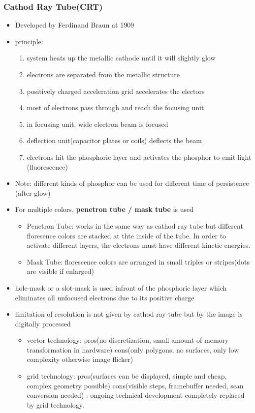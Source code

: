 \documentclass{standalone}
\begin{document}
\subsubsection*{Cathod Ray Tube(CRT)}
\begin{itemize}
\item Developed by Ferdinand Braun at 1909
\item principle:
	\begin{enumerate}
		\item system heats up the metallic cathode until it will slightly glow
		\item electrons are separated from the metallic structure
		\item positively charged acceleration grid accelerates the electors
		\item most of electrons pass through and reach the focusing unit
		\item in focusing unit, wide electron beam is focused 
		\item deflection unit(capacitor plates or coils) deflects the beam
		\item electrons hit the phosphoric layer and activates the phosphor to emit light (fluorescence)
	\end{enumerate}
\item Note: different kinds of phosphor can be used for different time of persistence (after-glow)
\item For multiple colors, \textbf{penetron tube / mask tube} is used
\begin{itemize}
\item Penetron Tube: works in the same way as cathod ray tube but different floresence colors are stacked at thte inside of the tube. In order to activate different layers, the electrons must have different kinetic energies.
\item Mask Tube: florescence colors are arranged in small triples or stripes(dots are visible if enlarged)
\end{itemize}
\item hole-mask or a slot-mask is used infront of the phosphoric layer which eliminates all unfocused electrons due to its positive charge
\item limitation of resolution is not given by cathod ray-tube but by the image is digitally processed
\begin{itemize}
\item vector technology: pros(no discretization, small amount of memory transformation in hardware) cons(only polygons, no surfaces, only low complexity otherwise image flicker)
\item grid technology: pros(surfaces can be displayed, simple and cheap, complex geometry possible) cons(visible steps, framebuffer needed, scan conversion needed) : ongoing technical development completely replaced by grid technology.
\end{itemize}
\end{itemize}
\end{document}
